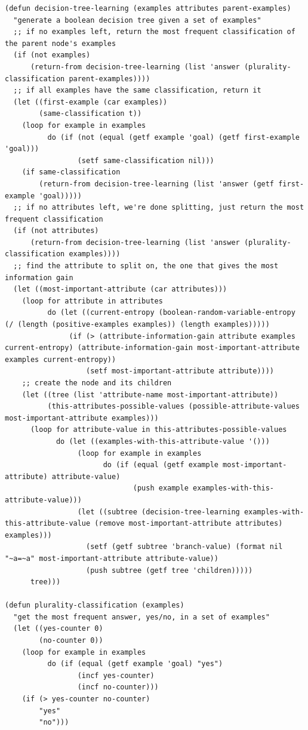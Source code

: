 \documentclass[a4paper,12pt]{article}
\begin{document}
\lstset{language=Lisp,label= ,caption= ,captionpos=b,numbers=none}
\begin{lstlisting}
(defun decision-tree-learning (examples attributes parent-examples)
  "generate a boolean decision tree given a set of examples"
  ;; if no examples left, return the most frequent classification of the parent node's examples
  (if (not examples)
      (return-from decision-tree-learning (list 'answer (plurality-classification parent-examples))))
  ;; if all examples have the same classification, return it
  (let ((first-example (car examples))
        (same-classification t))
    (loop for example in examples
          do (if (not (equal (getf example 'goal) (getf first-example 'goal)))
                 (setf same-classification nil)))
    (if same-classification
        (return-from decision-tree-learning (list 'answer (getf first-example 'goal)))))
  ;; if no attributes left, we're done splitting, just return the most frequent classification
  (if (not attributes)
      (return-from decision-tree-learning (list 'answer (plurality-classification examples))))
  ;; find the attribute to split on, the one that gives the most information gain
  (let ((most-important-attribute (car attributes)))
    (loop for attribute in attributes
          do (let ((current-entropy (boolean-random-variable-entropy (/ (length (positive-examples examples)) (length examples)))))
               (if (> (attribute-information-gain attribute examples current-entropy) (attribute-information-gain most-important-attribute examples current-entropy))
                   (setf most-important-attribute attribute))))
    ;; create the node and its children
    (let ((tree (list 'attribute-name most-important-attribute))
          (this-attributes-possible-values (possible-attribute-values most-important-attribute examples)))
      (loop for attribute-value in this-attributes-possible-values
            do (let ((examples-with-this-attribute-value '()))
                 (loop for example in examples
                       do (if (equal (getf example most-important-attribute) attribute-value)
                              (push example examples-with-this-attribute-value)))
                 (let ((subtree (decision-tree-learning examples-with-this-attribute-value (remove most-important-attribute attributes) examples)))
                   (setf (getf subtree 'branch-value) (format nil "~a=~a" most-important-attribute attribute-value))
                   (push subtree (getf tree 'children)))))
      tree)))

(defun plurality-classification (examples)
  "get the most frequent answer, yes/no, in a set of examples"
  (let ((yes-counter 0)
        (no-counter 0))
    (loop for example in examples
          do (if (equal (getf example 'goal) "yes")
                 (incf yes-counter)
                 (incf no-counter)))
    (if (> yes-counter no-counter)
        "yes"
        "no")))


\end{lstlisting}
\end{document}
